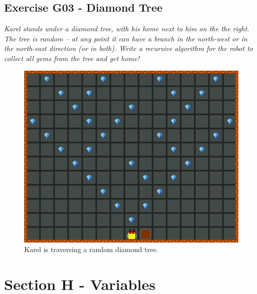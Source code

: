 \documentclass[article,A4,12pt]{llncs}
\begin{document}
{{{{\subsection{Exercise G03 - Diamond Tree}

{\em Karel stands under a diamond tree, with his home next to him on the the right. 
The tree is random -- at any point it can have 
a branch in the north-west or in the north-east direction (or in both). Write a recursive 
algorithm for the robot to collect all gems from the tree and get home!  }

\begin{figure}[!ht]
\begin{center}
\includegraphics[height=0.4\textwidth]{img/g03.png}
\end{center}
\vspace{-4mm}
\caption{Karel is traversing a random diamond tree.}
\label{fig:g03}
\vspace{-4mm}
\end{figure}
\noindent

%
%
%

\section{Section H - Variables}

}}}}
\end{document}
